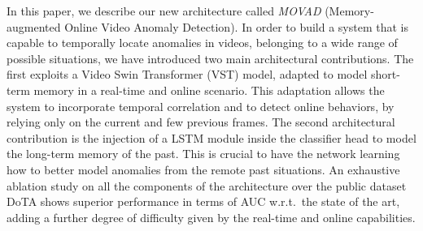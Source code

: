 In this paper, we describe our new architecture called \emph{MOVAD} (Memory-augmented Online Video Anomaly Detection).
In order to build a system that is capable to temporally locate anomalies in videos, belonging to a wide range of possible situations, we have introduced two main architectural contributions.
The first exploits a Video Swin Transformer \cite{liu_video_2022} (VST) model, adapted to model short-term memory in a real-time and online scenario.
This adaptation allows the system to incorporate temporal correlation and to detect online behaviors, by relying only on the current and few previous frames.
The second architectural contribution is the injection of a LSTM module inside the classifier head to model the long-term memory of the past.
This is crucial to have the network learning how to better model anomalies from the remote past situations.
An exhaustive ablation study on all the components of the architecture over the public dataset DoTA \cite{9712446} shows superior performance in terms of AUC w.r.t.~the state of the art, adding a further degree of difficulty given by the real-time and online capabilities.